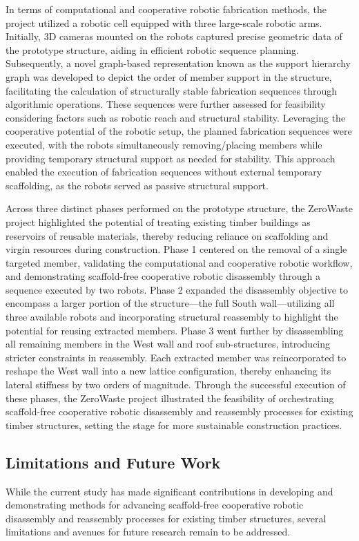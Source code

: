     In terms of computational and cooperative robotic fabrication methods, the project utilized a robotic cell equipped with three large-scale robotic arms. Initially, 3D cameras mounted on the robots captured precise geometric data of the prototype structure, aiding in efficient robotic sequence planning. Subsequently, a novel graph-based representation known as the support hierarchy graph was developed to depict the order of member support in the structure, facilitating the calculation of structurally stable fabrication sequences through algorithmic operations. These sequences were further assessed for feasibility considering factors such as robotic reach and structural stability. Leveraging the cooperative potential of the robotic setup, the planned fabrication sequences were executed, with the robots simultaneously removing/placing members while providing temporary structural support as needed for stability. This approach enabled the execution of fabrication sequences without external temporary scaffolding, as the robots served as passive structural support.
    
    Across three distinct phases performed on the prototype structure, the ZeroWaste project highlighted the potential of treating existing timber buildings as reservoirs of reusable materials, thereby reducing reliance on scaffolding and virgin resources during construction. Phase 1 centered on the removal of a single targeted member, validating the computational and cooperative robotic workflow, and demonstrating scaffold-free cooperative robotic disassembly through a sequence executed by two robots. Phase 2 expanded the disassembly objective to encompass a larger portion of the structure—the full South wall—utilizing all three available robots and incorporating structural reassembly to highlight the potential for reusing extracted members. Phase 3 went further by disassembling all remaining members in the West wall and roof sub-structures, introducing stricter constraints in reassembly. Each extracted member was reincorporated to reshape the West wall into a new lattice configuration, thereby enhancing its lateral stiffness by two orders of magnitude. Through the successful execution of these phases, the ZeroWaste project illustrated the feasibility of orchestrating scaffold-free cooperative robotic disassembly and reassembly processes for existing timber structures, setting the stage for more sustainable construction practices.

\subsection{Limitations and Future Work}
    While the current study has made significant contributions in developing and demonstrating methods for advancing scaffold-free cooperative robotic disassembly and reassembly processes for existing timber structures, several limitations and avenues for future research remain to be addressed.

